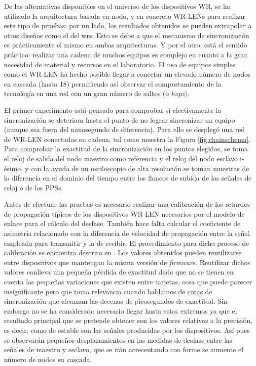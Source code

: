 De las alternativas disponibles en el universo de los dispositivos WR, se ha 
utilizado la arquitectura basada en nodo, y en concreto 
WR-LENs para realizar este tipo de pruebas: por un lado, los resultados 
obtenidos se pueden extrapolar a otros diseños como el del \gls{wrs}. Esto se 
debe a que el mecanismo de sincronización es prácticamente el mismo en ambas 
arquitecturas. Y por el otro, está el sentido práctico: realizar una cadena de 
muchos equipos es complejo en cuanto a la gran necesidad de material y recursos 
en el laboratorio. El uso de equipos simples como el WR-LEN ha hecho posible 
llegar a conectar un elevado número de nodos en cascada (hasta 18) permitiendo 
así observar el comportamiento de la tecnología en una red con un gran número 
de saltos (o \textit{hops}).

El primer experimento está pensado para comprobar si efectivamente la 
sincronización se deteriora hasta el punto de no lograr sincronizar un equipo 
(aunque sea fuera del nanosegundo de diferencia).
Para ello se desplegó una red de WR-LEN conectadas en cadena, tal como muestra 
la Figura \ref{fig:chainschema}. Para comprobar la exactitud de la 
sincronización en los puntos elegidos, se toma el reloj de salida del nodo 
maestro como referencia y el reloj del nodo esclavo i-ésimo, y con la ayuda de 
un osciloscopio de alta resolución se toman muestras de la diferencia en el 
dominio del tiempo entre los flancos de subida de las señales de reloj o de los 
PPSs.

Antes de efectuar las pruebas es necesario realizar una calibración de los 
retardos de propagación típicos de los dispositivos WR-LEN necesarios por el 
modelo de enlace para el cálculo del desfase. También hace falta calcular el 
coeficiente de asimetría relacionado con la diferencia de velocidad de 
propagación entre la señal empleada para transmitir y la de recibir. El 
procedimiento para dicho proceso de calibración se encuentra descrito en 
\cite{man:calib}. Los valores obtenidos pueden reutilizarse entre dispositivos 
que mantengan la misma versión de \textit{firmware}. Reutilizar dichos valores 
conlleva una pequeña pérdida de exactitud dado que no se tienen en cuenta las 
pequeñas variaciones que existen entre tarjetas, cosa que puede parecer 
insignificante pero que toma relevancia cuando hablamos de cotas de 
sincronización que alcanzan las decenas de picosegundos de exactitud. Sin 
embargo no se ha considerado necesario llegar hasta estos extremos ya que el 
resultado principal que se pretende obtener son los valores relativos a la 
precisión, es decir, como de estable son las señales producidas por los 
dispositivos. Así pues se observarán pequeños desplazamientos en las medidas de 
desfase entre las señales de maestro y esclavo, que se irán acrecentando con 
forme se aumente el número de nodos en cascada.

